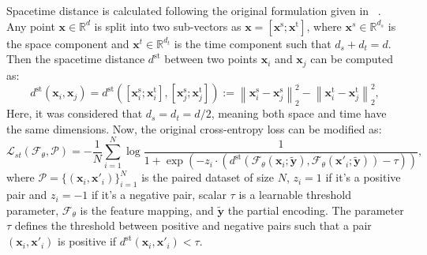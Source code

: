             Spacetime distance is calculated following the original formulation given in ~\cite{SpaceMesh}. Any point $\mathbf{x} \in \mathbb{R}^d$ is split into two sub-vectors as $\mathbf{x} = [\mathbf{x}^{\mathrm{s}}; \mathbf{x}^{\mathrm{t}}]$, where $\mathbf{x}^s\in \mathbb{R}^{d_s}$ is the space component and  $\mathbf{x}^t\in \mathbb{R}^{d_t}$ is the time component such that $d_s + d_t = d$. Then the spacetime distance $d^{\mathrm{st}}$ between two points $\mathbf{x}_i$ and $\mathbf{x}_j$ can be computed as:
            \begin{equation}
                d^{\mathrm{st}}\left(\mathbf{x}_{i}, \mathbf{x}_{j}\right)=d^{\mathrm{st}}\left(\left[\mathbf{x}_{i}^{\mathrm{s}}; \mathbf{x}_{i}^{\mathrm{t}}\right],\left[\mathbf{x}_{j}^{\mathrm{s}}; \mathbf{x}_{j}^{\mathrm{t}}\right]\right):=\left\|\mathbf{x}_{i}^{\mathrm{s}}-\mathbf{x}_{j}^{\mathrm{s}}\right\|_{2}^{2}-\left\|\mathbf{x}_{i}^{\mathrm{t}}-\mathbf{x}_{j}^{\mathrm{t}}\right\|_{2}^{2},
            \end{equation}
            Here, it was considered that $d_s = d_t = d/2$, meaning both space and time have the same dimensions. Now, the original cross-entropy loss can be modified as:
            \begin{equation}
                \mathcal{L}_{st}(\mathcal{F}_\theta, \mathcal{P}) = -\frac{1}{N}\sum_{i=1}^N \log \frac{1}{1+ \exp(-z_i \cdot \left(d^{\mathrm{st}}(\mathcal{F}_\theta(\mathbf{x}_i; \mathbf{\tilde{y}}), \mathcal{F}_\theta(\mathbf{x'}_i; \mathbf{\tilde{y}}))- \tau\right))},
            \end{equation}
            where $\mathcal{P} = \{(\mathbf{x}_i, \mathbf{x'}_i)\}_{i=1}^N$ is the paired dataset of size $N$, $z_i=1$ if it's a positive pair and $z_i=-1$ if it's a negative pair, scalar $\tau$ is a learnable threshold parameter, $\mathcal{F}_\theta$ is the feature mapping, and $\mathbf{\tilde{y}}$ the partial encoding. The parameter $\tau$ defines the threshold between positive and negative pairs such that a pair $(\mathbf{x}_i, \mathbf{x'}_i)$ is positive if $d^{\mathrm{st}}(\mathbf{x}_i, \mathbf{x'}_i) < \tau$.


